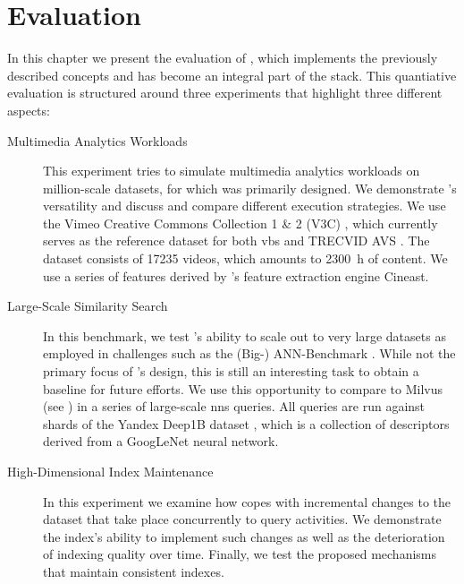\chapter{Evaluation}
\label{chapter:evaluation}

In this chapter we present the evaluation of \cottontail{} \cite{Gasser:2020Cottontail}, which implements the previously described concepts and has become an integral part of the \vitrivr{} \cite{Rossetto:2016Vitrivr,Gasser:2019Towards,Gasser:2019Multimodal} stack. This quantiative evaluation is structured around three experiments that highlight three different aspects:

\begin{description}
    \item[Multimedia Analytics Workloads] This experiment tries to simulate multimedia analytics workloads on million-scale datasets, for which \cottontail{} was primarily designed. We demonstrate \cottontail{}'s versatility and discuss and compare different execution strategies. We use the Vimeo Creative Commons Collection 1 \& 2 (V3C) \cite{Berns:2019V3C1,Rossetto:2021Insights}, which currently serves as the reference dataset for both \acrshort{vbs} \cite{Schoeffmann:2019Video} and TRECVID AVS \cite{Chen:2021What}. The dataset consists of  \SI{17235}{} videos, which amounts to \SI{2300}{\hour} of content. We use a series of features derived by \vitrivr{}'s feature extraction engine Cineast.
    \item[Large-Scale Similarity Search] In this benchmark, we test \cottontail{}'s ability to scale out to very large datasets as employed in challenges such as the (Big-) ANN-Benchmark \cite{Aumueller:2017ANN,Simhadri:2022Results}. While not the primary focus of \cottontail{}'s design, this is still an interesting task to obtain a baseline for future efforts. We use this opportunity to compare \cottontail{} to Milvus (see ) in a series of large-scale \acrshort{nns} queries. All queries are run against shards of the Yandex Deep1B dataset \cite{Babenko:2016Efficient}, which is a collection of descriptors derived from a GoogLeNet \cite{Szegedy:2015Going} neural network.
    \item[High-Dimensional Index Maintenance] In this experiment we examine how \cottontail{} copes with incremental changes to the dataset that take place concurrently to query activities. We demonstrate the index's ability to implement such changes as well as the deterioration of indexing quality over time. Finally, we test the proposed mechanisms that maintain consistent indexes.
\end{description}

